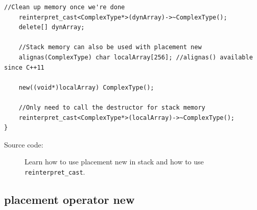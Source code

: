 \documentclass[a4paper,11pt,twoside]{book}
\begin{document}
\begin{itemize}
\begin{lstlisting}[numbers=none]
	//Clean up memory once we're done
	reinterpret_cast<ComplexType*>(dynArray)->~ComplexType();
	delete[] dynArray;
	
	//Stack memory can also be used with placement new
	alignas(ComplexType) char localArray[256]; //alignas() available since C++11
	
	new((void*)localArray) ComplexType();
	
	//Only need to call the destructor for stack memory
	reinterpret_cast<ComplexType*>(localArray)->~ComplexType();
}
\end{lstlisting}
\begin{description}
	\item[Source code:] Learn how to use placement new in stack and how to use \texttt{reinterpret\_cast}.
\end{description}

\end{itemize}

\subsection{placement operator new}
\end{document}
